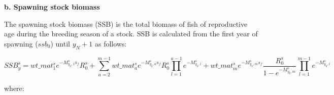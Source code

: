 \documentclass{article}
\begin{document}
\textbf{b. Spawning stock biomass}

The spawning stock biomass (SSB) is the total biomass of fish of reproductive age during the breeding season of a stock. SSB is calculated from the first year of spawning ($ssb_0$) until $y_N+1$ as follows:



\begin{equation}
    SSB^s_y=wt\_{mat}^s_1 e^{-M^s_{y_0,1}s_f} R^s_0 +  
            \sum_{a=2}^{m-1}wt\_{mat}^s_a e^{-M^s_{y_0,a}s_f} R^s_0\prod_{l=1}^{a-1}e^{-M^s_{y_0,l}} + 
            {wt\_mat}^s_{m} e^{-M^s_{y_0,m}s_f} \dfrac{R^s_0}{1-e^{-M^s_{y_0,m}}}\prod_{l=1}^{m-1}e^{-M^s_{y_0,l}}
\end{equation}
  
where:
\end{document}
